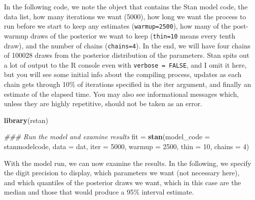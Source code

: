 \documentclass[]{book}
\newenvironment{Shaded}{\begin{snugshade}}{\end{snugshade}}
\newcommand{\CommentTok}[1]{\textcolor[rgb]{0.56,0.35,0.01}{\textit{#1}}}
\newcommand{\DataTypeTok}[1]{\textcolor[rgb]{0.13,0.29,0.53}{#1}}
\newcommand{\DecValTok}[1]{\textcolor[rgb]{0.00,0.00,0.81}{#1}}
\newcommand{\KeywordTok}[1]{\textcolor[rgb]{0.13,0.29,0.53}{\textbf{#1}}}
\newcommand{\NormalTok}[1]{#1}
\newcommand{\StringTok}[1]{\textcolor[rgb]{0.31,0.60,0.02}{#1}}
\begin{document}
In the following code, we note the object that contains the Stan model code, the data list, how many iterations we want (5000), how long we want the process to run before we start to keep any estimates (\texttt{warmup=2500}), how many of the post-warmup draws of the posterior we want to keep (\texttt{thin=10} means every tenth draw), and the number of chains (\texttt{chains=4}). In the end, we will have four chains of 100028 draws from the posterior distribution of the parameters. Stan spits out a lot of output to the R console even with \texttt{verbose\ =\ FALSE}, and I omit it here, but you will see some initial info about the compiling process, updates as each chain gets through 10\% of iterations specified in the iter argument, and finally an estimate of the elapsed time. You may also see informational messages which, unless they are highly repetitive, should not be taken as an error.

\begin{Shaded}
\begin{Highlighting}[]
\KeywordTok{library}\NormalTok{(rstan)}

\CommentTok{### Run the model and examine results}
\NormalTok{fit =}\StringTok{ }\KeywordTok{stan}\NormalTok{(}\DataTypeTok{model_code =}\NormalTok{ stanmodelcode,}
           \DataTypeTok{data =}\NormalTok{ dat,}
           \DataTypeTok{iter =} \DecValTok{5000}\NormalTok{,}
           \DataTypeTok{warmup =} \DecValTok{2500}\NormalTok{,}
           \DataTypeTok{thin =} \DecValTok{10}\NormalTok{,}
           \DataTypeTok{chains =} \DecValTok{4}\NormalTok{)}
\end{Highlighting}
\end{Shaded}

With the model run, we can now examine the results. In the following, we specify the digit precision to display, which parameters we want (not necessary here), and which quantiles of the posterior draws we want, which in this case are the median and those that would produce a 95\% interval estimate.
\end{document}
